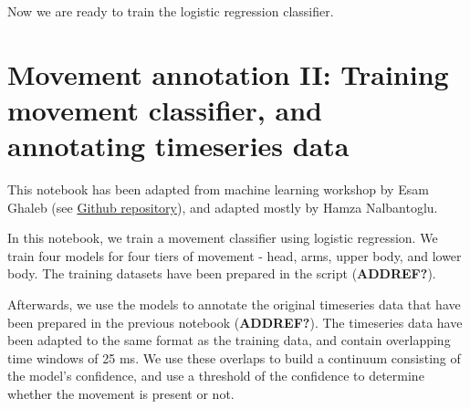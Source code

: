 \documentclass[
  letterpaper,
  DIV=11,
  numbers=noendperiod]{scrreprt}
\begin{document}
Now we are ready to train the logistic regression classifier.


\chapter{Movement annotation II: Training movement classifier, and
annotating timeseries
data}\label{movement-annotation-ii-training-movement-classifier-and-annotating-timeseries-data}

This notebook has been adapted from machine learning workshop by Esam
Ghaleb (see
\href{https://github.com/EsamGhaleb/MachineLearningBasics}{Github
repository}), and adapted mostly by Hamza Nalbantoglu.

In this notebook, we train a movement classifier using logistic
regression. We train four models for four tiers of movement - head,
arms, upper body, and lower body. The training datasets have been
prepared in the script (\textbf{ADDREF?}).

Afterwards, we use the models to annotate the original timeseries data
that have been prepared in the previous notebook (\textbf{ADDREF?}). The
timeseries data have been adapted to the same format as the training
data, and contain overlapping time windows of 25 ms. We use these
overlaps to build a continuum consisting of the model's confidence, and
use a threshold of the confidence to determine whether the movement is
present or not.
\end{document}
